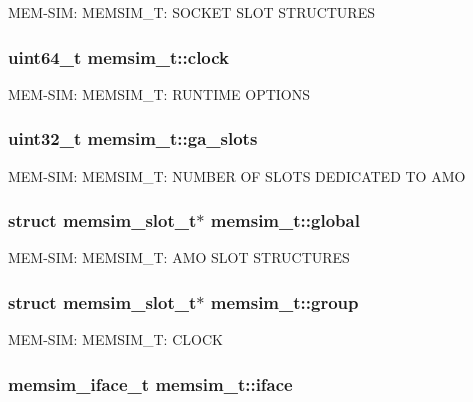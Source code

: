 M\-E\-M-\/\-S\-I\-M\-: M\-E\-M\-S\-I\-M\-\_\-\-T\-: S\-O\-C\-K\-E\-T S\-L\-O\-T S\-T\-R\-U\-C\-T\-U\-R\-E\-S \hypertarget{structmemsim__t_a09a7513daf69ea79d15c89b11efe5431}{
\subsubsection[{clock}]{\setlength{\rightskip}{0pt plus 5cm}uint64\-\_\-t memsim\-\_\-t\-::clock}}\label{structmemsim__t_a09a7513daf69ea79d15c89b11efe5431}
M\-E\-M-\/\-S\-I\-M\-: M\-E\-M\-S\-I\-M\-\_\-\-T\-: R\-U\-N\-T\-I\-M\-E O\-P\-T\-I\-O\-N\-S \hypertarget{structmemsim__t_af10e3ad73189bf418d29478bb4de5eb2}{
\subsubsection[{ga\-\_\-slots}]{\setlength{\rightskip}{0pt plus 5cm}uint32\-\_\-t memsim\-\_\-t\-::ga\-\_\-slots}}\label{structmemsim__t_af10e3ad73189bf418d29478bb4de5eb2}
M\-E\-M-\/\-S\-I\-M\-: M\-E\-M\-S\-I\-M\-\_\-\-T\-: N\-U\-M\-B\-E\-R O\-F S\-L\-O\-T\-S D\-E\-D\-I\-C\-A\-T\-E\-D T\-O A\-M\-O \hypertarget{structmemsim__t_a3b005d5aa8e759a08281f59c9f05ed3b}{
\subsubsection[{global}]{\setlength{\rightskip}{0pt plus 5cm}struct {\bf memsim\-\_\-slot\-\_\-t}$\ast$ memsim\-\_\-t\-::global}}\label{structmemsim__t_a3b005d5aa8e759a08281f59c9f05ed3b}
M\-E\-M-\/\-S\-I\-M\-: M\-E\-M\-S\-I\-M\-\_\-\-T\-: A\-M\-O S\-L\-O\-T S\-T\-R\-U\-C\-T\-U\-R\-E\-S \hypertarget{structmemsim__t_a0569d3661744c965a6620ca75563144d}{
\subsubsection[{group}]{\setlength{\rightskip}{0pt plus 5cm}struct {\bf memsim\-\_\-slot\-\_\-t}$\ast$ memsim\-\_\-t\-::group}}\label{structmemsim__t_a0569d3661744c965a6620ca75563144d}
M\-E\-M-\/\-S\-I\-M\-: M\-E\-M\-S\-I\-M\-\_\-\-T\-: C\-L\-O\-C\-K \hypertarget{structmemsim__t_a37831c21b74789b55a12495be077d120}{
\subsubsection[{iface}]{\setlength{\rightskip}{0pt plus 5cm}memsim\-\_\-iface\-\_\-t memsim\-\_\-t\-::iface}}\label{structmemsim__t_a37831c21b74789b55a12495be077d120}
